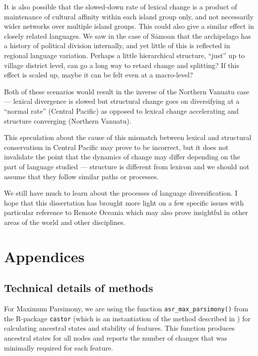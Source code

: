 \documentclass[a4paper,10pt]{article} %
\begin{document}
It is also possible that the slowed-down rate of lexical change is a product of maintenance of cultural affinity within each island group only, and not necessarily wider networks over multiple island groups. This could also give a similar effect in closely related languages. We saw in the case of S\={a}moan that the archipelago has a history of political division internally, and yet little of this is reflected in regional language variation. Perhaps a little hierarchical structure, ``just'' up to village district level, can go a long way to retard change and splitting? If this effect is scaled up, maybe it can be felt even at a macro-level?

Both of these scenarios would result in the inverse of the Northern Vanuatu case --- lexical divergence is slowed but structural change goes on diversifying at a ``normal rate'' (Central Pacific) as opposed to lexical change accelerating and structure converging (Northern Vanuatu).

This speculation about the cause of this mismatch between lexical and structural conservatism in Central Pacific may prove to be incorrect, but it does not invalidate the point that the dynamics of change may differ depending on the part of language studied --- structure is different from lexicon and we should not assume that they follow similar paths or processes. 

We still have much to learn about the processes of language diversification. I hope that this dissertation has brought more light on a few specific issues with particular reference to Remote Oceania which may also prove insightful in other areas of the world and other disciplines.

\newpage
\singlespacing




\newpage
\singlespacing
\appendix
\section*{Appendices}
\renewcommand{\thesubsection}{\Alph{subsection}}

\subsection{Technical details of methods}
\label{supp:tech_details}

For Maximum Parsimony, we are using the function \texttt{asr\_max\_parsimony()} from the R-package \texttt{castor} \citep{louca2017efficient} (which is an instantiation of the method described in \citet{sankoff1975minimal}) for calculating ancestral states and stability of features. This function produces ancestral states for all nodes and reports the number of changes that was minimally required for each feature. 
\end{document}

